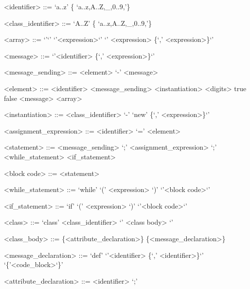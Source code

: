 \documentclass{eplDoc}
\begin{document}
\maketitle
\newpage

\begin{grammar}
<identifier> ::= `a..z' \{ `a..z,A..Z,\_,0..9,'\} 

<class\_identifier> ::= `A..Z' \{ `a..z,A..Z,\_,0..9,'\} 

<array> ::= `{'`}' \alt `{'<expression>`}' \alt `{' <expression> \{`,' <expression>\}`}'

<message> ::= `{'<identifier> \{`,' <expression>\}`}'

<message\_sending> ::= <element> `\<-' <message>

<element> ::= <identifier> 
\alt<message\_sending>
\alt<instantiation>
\alt<digits>
\alt true \alt false
\alt <message>
\alt <array>


<instantiation> ::= <class\_identifier> `\<-' `{new' \{`,' <expression>\}`}'


<assignment\_expression> ::= <identifier> `=' <element>

<statement> ::= <message_sending> `;'
\alt <assignment\_expression>
 `;'
\alt <while\_statement>
\alt <if\_statement>

<block code> ::= { <statement> }

<while\_statement> ::= `while' `(' <expression> `)'  `{'<block code>`}'

<if\_statement> ::= `if' `(' <expression> `)'  `{'<block code>`}'




<class> ::= `class' <class\_identifier> `{' <class body> `}'

<class\_body> ::= \{<attribute\_declaration>\} \{<message\_declaration>\}

<message\_declaration> ::= `def'  `{'<identifier> \{`,' <identifier>\}`}' `\{'<code\_block>`\}'

<attribute\_declaration> ::= <identifier> `;'









\end{grammar}
\end{document}
